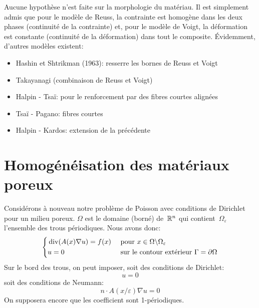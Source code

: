 Aucune hypothèse n'est faite sur la morphologie du matériau. Il est simplement admis que pour le modèle de Reuss, la contrainte est homogène dans les deux phases (continuité de la contrainte) et, pour le modèle de Voigt,
la déformation est constante (continuité de la déformation) dans tout le composite. 
\medskipvm
Évidemment, d'autres modèles existent:
\begin{itemize}
	\item Hashin et Shtrikman (1963): resserre les bornes de Reuss et Voigt
	\item Takayanagi (combinaison de Reuss et Voigt)
	\item Halpin - Tsaï: pour le renforcement par des fibres courtes alignées
	\item Tsaï - Pagano: fibres courtes
	\item Halpin - Kardos: extension de la précédente
\end{itemize}

\medskip
\section{Homogénéisation des matériaux poreux}

Considérons à nouveau notre problème de Poisson avec conditions de Dirichlet pour un milieu poreux. $\Omega$ est le domaine (borné) de~$\mathbb R^n$ qui contient~$\Omega_\varepsilon$ l'ensemble des trous périodiques. Nous avons donc:
\begin{equation}
\left\{
\begin{aligned}
&\operatorname{div}(A(x)\nabla u) = f(x) &&\text{ pour } x\in\Omega\backslash\Omega_\varepsilon\\
&u=0 && \text{ sur le contour extérieur } \Gamma=\partial\Omega\\
\end{aligned}
\right.
\end{equation}
Sur le bord des trous, on peut imposer, soit des conditions de Dirichlet:
\begin{equation}u=0 \end{equation}
soit des conditions de Neumann:
\begin{equation}n\cdot A(x/\varepsilon)\nabla u=0 \end{equation}
On supposera encore que les coefficient sont 1-périodiques.

